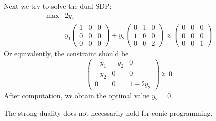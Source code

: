 \begin{example}
Next we try to solve the dual SDP:
\[
\begin{array}{ll}
\max&2y_2\\
&y_1\begin{pmatrix}
1&0&0\\0&0&0\\0&0&0
\end{pmatrix}+y_2\begin{pmatrix}
0&1&0\\1&0&0\\0&0&2
\end{pmatrix}\preceq\begin{pmatrix}
0&0&0\\0&0&0\\0&0&1
\end{pmatrix}
\end{array}
\]
Or equivalently, the constraint should be
\[
\begin{pmatrix}
-y_1&-y_2&0\\-y_2&0&0\\0&0&1-2y_2
\end{pmatrix}\succeq0
\]
After computation, we obtain the optimal value $y_2=0$.
\end{example}

\begin{remark}
The strong duality does not necessarily hold for conic programming.
\end{remark}









